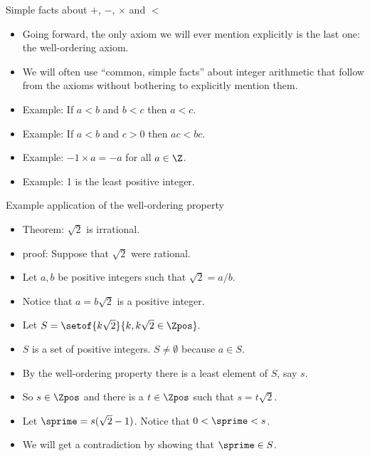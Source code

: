 \documentclass[handout]{beamer}
\begin{document}
\begin{frame}{Simple facts about $+$, $-$, $\times$ and $<$}

\begin{itemize}
  \item Going forward, the only axiom we will ever mention explicitly is the last one: the well-ordering axiom.
  \item We will often use ``common, simple facts'' about integer arithmetic that follow
  from the axioms without bothering to explicitly mention them.
  \item Example: If $a<b$ and $b<c$ then $a < c$.
  \item Example: If $a<b$ and $c>0$ then $ac < bc$.
  \item Example: $-1\times a = -a$ for all $a\in\Z$.
  \item Example: 1 is the least positive integer.
\end{itemize}

\end{frame}

\begin{frame}{Example application of the well-ordering property}

\begin{itemize}
  \item Theorem: $\sqrt{2}$ is irrational.
  \item proof: Suppose that $\sqrt{2}$ were rational.
  \item Let $a,b$ be positive integers such that $\sqrt{2}=a/b$.
  \item Notice that $a=b\sqrt{2}$ is a positive integer.
  \item Let $S=\setof{k\sqrt{2}}{k,k\sqrt{2}\in\Zpos}.$
  \item $S$ is a set of positive integers. $S\not=\emptyset$ because $a\in S$.
  \item By the well-ordering property there is a least element of $S$, say $s$.
  \item So $s\in\Zpos$ and there is a $t\in\Zpos$ such that $s=t\sqrt{2}$.
  \item Let $\sprime = s(\sqrt{2} - 1)$. Notice that $0< \sprime<s$.
  \item We will get a contradiction by showing that $\sprime\in S$.
\end{itemize}

\end{frame}
\end{document}
